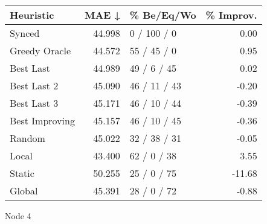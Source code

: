 \begin{tabular}{lrlr}
\toprule
\textbf{Heuristic} & \textbf{MAE ↓} & \textbf{\% Be/Eq/Wo} & \textbf{\% Improv.} \\
\midrule
            Synced &         44.998 &          0 / 100 / 0 &                0.00 \\
     Greedy Oracle &         44.572 &          55 / 45 / 0 &                0.95 \\
         Best Last &         44.989 &          49 / 6 / 45 &                0.02 \\
       Best Last 2 &         45.090 &         46 / 11 / 43 &               -0.20 \\
       Best Last 3 &         45.171 &         46 / 10 / 44 &               -0.39 \\
    Best Improving &         45.157 &         46 / 10 / 45 &               -0.36 \\
            Random &         45.022 &         32 / 38 / 31 &               -0.05 \\
             Local &         43.400 &          62 / 0 / 38 &                3.55 \\
            Static &         50.255 &          25 / 0 / 75 &              -11.68 \\
            Global &         45.391 &          28 / 0 / 72 &               -0.88 \\
\bottomrule
\end{tabular}
\caption{Node 4}
\label{tab:non_lr01_le2_bs4_4}
